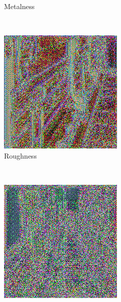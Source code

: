 \begin{figure}[h!]
\begin{subfigure}[b]{0.175\textwidth}
     \caption{Metalness}
    \end{subfigure}
    ~
    \begin{subfigure}[b]{0.175\textwidth}
     \includegraphics[width=\textwidth]{figures/result/quadruple/depth_albedo_normal_roughness/1.png}
     \caption{Roughness}
    \end{subfigure}
    \\ \vspace{0.2cm}
    \begin{subfigure}[b]{0.175\textwidth}
     \includegraphics[width=\textwidth]{figures/result/quadruple/albedo_normal_emissive_position/2.png}

\end{subfigure}
\end{figure}
